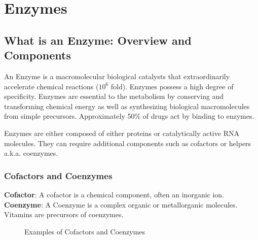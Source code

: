 \documentclass[../main.tex]{subfiles}
\begin{document}
	

\section{Enzymes}

\subsection{What is an Enzyme: Overview and Components}

An \gls{Enzyme} is a macromolecular biological catalysts that extraordinarily accelerate chemical reactions ($10^{6}$ fold). Enzymes possess a high degree of specificity. Enzymes are essential to the metabolism by conserving and transforming chemical energy as well as synthesizing biological macromolecules from simple precursors. Approximately 50\% of drugs act by binding to enzymes. 

Enzymes are either composed of either proteins or catalytically active RNA molecules. They can require additional components such as cofactors or helpers a.k.a. coenzymes.

\subsubsection{Cofactors and Coenzymes}

\textbf{\gls{Cofactor}}: A cofactor is a chemical component, often an inorganic ion.
\textbf{\gls{Coenzyme}}: A Coenzyme is a complex organic or metallorganic molecules. Vitamins are precursors of coenzymes.

\begin{figure}[h]
	\centering
	\hfill
	\caption{Examples of Cofactors and Coenzymes}
\end{figure}
\end{document}
